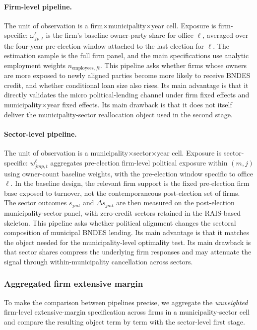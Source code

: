 \documentclass{article}
\begin{document}
\paragraph{Firm-level pipeline.}
The unit of observation is a firm$\times$municipality$\times$year cell.
Exposure is firm-specific:
$\omega^\ell_{fp,t}$ is the firm's baseline owner-party share for office $\ell$, averaged over the
four-year pre-election window attached to the last election for $\ell$.
The estimation sample is the full firm panel, and the main specifications use
analytic employment weights $n_{\text{employees},ft}$.
This pipeline asks whether firms whose owners are more exposed to newly aligned
parties become more likely to receive BNDES credit, and whether conditional
loan size also rises.
Its main advantage is that it directly validates the micro political-lending
channel under firm fixed effects and municipality$\times$year fixed effects.
Its main drawback is that it does not itself deliver the municipality-sector
reallocation object used in the second stage.

\paragraph{Sector-level pipeline.}
The unit of observation is a municipality$\times$sector$\times$year cell.
Exposure is sector-specific:
$w^\ell_{jmp,t}$ aggregates pre-election firm-level political exposure within
$(m,j)$ using owner-count baseline weights, with the pre-election window specific to office $\ell$.
In the baseline design, the relevant firm support is the fixed pre-election
firm base exposed to turnover, not the contemporaneous post-election set of
firms.
The sector outcomes $s_{jmt}$ and $\Delta s_{jmt}$ are then measured on the
post-election municipality-sector panel, with zero-credit sectors retained in
the RAIS-based skeleton.
This pipeline asks whether political alignment changes the sectoral composition
of municipal BNDES lending.
Its main advantage is that it matches the object needed for the
municipality-level optimality test.
Its main drawback is that sector shares compress the underlying firm responses
and may attenuate the signal through within-municipality cancellation across
sectors.

\subsubsection{Aggregated firm extensive margin}\label{sec:agg-ext-sector}

To make the comparison between pipelines precise, we aggregate the
\emph{unweighted} firm-level extensive-margin specification across firms in a
municipality-sector cell and compare the resulting object term by term with the
sector-level first stage.
\end{document}
